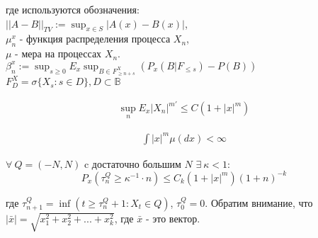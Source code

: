 \begin{flushleft}
	{
		\setlength{\leftskip}{5em}
		\setlength{\rightskip}{5em}
		где используются обозначения: \\
		$ \left|\left|A-B\right|\right|_{TV} := \sup_{x \in S} \left|A(x) - B(x)\right|$, \\
		$\mu^x_n$ - функция распределения процесса $X_n$, \\
		$\mu$ - мера на процессах $X_n$. \\ %
		$\beta^x_n := \sup_{s \ge 0}E_x \sup_{B \in F^X_{\ge n + s}}\left(P_x\left(B|F_{\le s}\right) - P\left(B\right)\right)$ \\
		$F^X_D = \sigma \{ X_s : s \in D \} , D \subset \mathbb{B}$ \\
	}
\end{flushleft}
	
	
\begin{equation} \label{moments_limiting}
    \begin{split}
        \sup_n E_x \left| X_n \right| ^{m'} \le C \left( 1 + |x|^m \right)
    \end{split}
\end{equation}

\begin{equation} \label{measure_limiting}
    \begin{split}
        \int |x|^m \mu (dx) < \infty
    \end{split}
\end{equation}

$\forall \ Q=\left(-N, N\right)$ c достаточно большим $N$ $\exists \ \kappa < 1$:
\begin{equation} \label{something}
	P_x\left(\tau^Q_n \ge \kappa^{-1}\cdot n \right) \le C_k \left( 1 +|x|^m \right)\left(1 + n\right)^{-k}
\end{equation}
\begin{flushleft}
	{
	\setlength{\leftskip}{5em}
		\setlength{\rightskip}{5em}
    	где $\tau^Q_{n+1}=\inf \left(t\ge \tau^Q_n +1 : X_t \in Q \right)$, $\tau^Q_0 = 0$. Обратим внимание, что $\left|\bar{x}\right|=\sqrt{x^2_1+x^2_2+...+x^2_k}$, где $\bar{x}$ - это вектор.
    	\\
	}
\end{flushleft}

